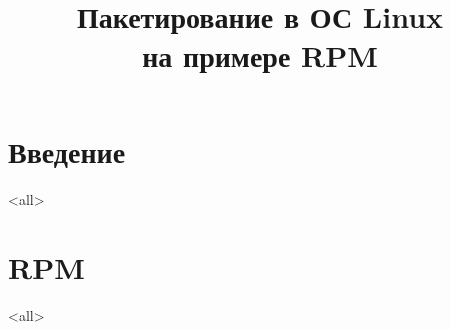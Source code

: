 

\title[RPM]{Пакетирование в ОС Linux\\на примере RPM}





\begin{frame}
	\frametitle{}
	\titlepage
	\vspace{-0.5cm}
	\begin{center}
	\end{center}
\end{frame}

\begin{frame}
	\tableofcontents
\end{frame}




\section{Введение}
\mode<all>{}

\section{RPM}
\mode<all>{}


